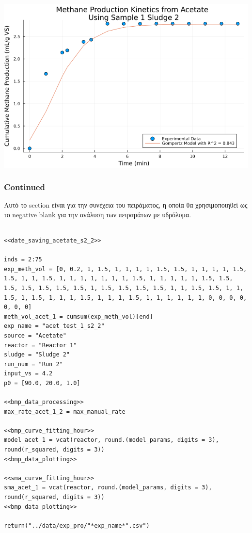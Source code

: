 \documentclass[11pt]{article}
\begin{document}
\begin{center}
\includegraphics[width=.9\linewidth]{../plots/BMPs/Acetate/specific_methane_kinetics_acet_test_1_s2.png}
\end{center}

\subsubsection{Continued}
\label{sec:org9db2d6c}
Αυτό το section είναι για την συνέχεια του πειράματος, η οποία θα χρησιμοποιηθεί ως το negative blank για την ανάλυση των πειραμάτων με υδρόλυμα.

\begin{verbatim}

<<date_saving_acetate_s2_2>>

inds = 2:75
exp_meth_vol = [0, 0.2, 1, 1.5, 1, 1, 1, 1, 1.5, 1.5, 1, 1, 1, 1, 1.5, 1.5, 1, 1, 1.5, 1, 1, 1, 1, 1, 1, 1, 1.5, 1, 1, 1, 1, 1, 1.5, 1.5, 1.5, 1.5, 1.5, 1.5, 1.5, 1, 1.5, 1.5, 1.5, 1.5, 1, 1, 1.5, 1.5, 1, 1, 1.5, 1, 1.5, 1, 1, 1, 1.5, 1, 1, 1, 1.5, 1, 1, 1, 1, 1, 1, 0, 0, 0, 0, 0, 0, 0]
meth_vol_acet_1 = cumsum(exp_meth_vol)[end]
exp_name = "acet_test_1_s2_2"
source = "Acetate"
reactor = "Reactor 1"
sludge = "Sludge 2"
run_num = "Run 2"
input_vs = 4.2
p0 = [90.0, 20.0, 1.0]

<<bmp_data_processing>>
max_rate_acet_1_2 = max_manual_rate

<<bmp_curve_fitting_hour>>
model_acet_1 = vcat(reactor, round.(model_params, digits = 3), round(r_squared, digits = 3))
<<bmp_data_plotting>>

<<sma_curve_fitting_hour>>
sma_acet_1 = vcat(reactor, round.(model_params, digits = 3), round(r_squared, digits = 3))  
<<bmp_data_plotting>>

return("../data/exp_pro/"*exp_name*".csv")

\end{verbatim}
\end{document}
